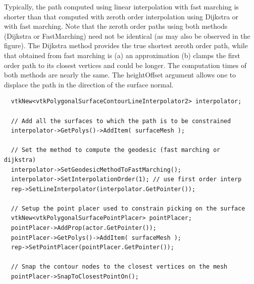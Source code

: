 \documentclass{InsightArticle}
\begin{document}
Typically, the path computed using linear interpolation with fast marching is shorter than that computed with zeroth order interpolation using Dijkstra or with fast marching.
Note that the zeroth order paths using both methods (Dijkstra or FastMarching) need not be identical (as may also be observed in the figure). 
The Dijkstra method provides the true shortest zeroth order path, while that obtained from fast marching is (a) an approximation (b) clamps the first order path to its closest vertices and could be longer.
The computation times of both methods are nearly the same. The heightOffset argument allows one to displace the path in the direction of the surface normal.

\begin{lstlisting}
  vtkNew<vtkPolygonalSurfaceContourLineInterpolator2> interpolator;

  // Add all the surfaces to which the path is to be constrained
  interpolator->GetPolys()->AddItem( surfaceMesh );

  // Set the method to compute the geodesic (fast marching or dijkstra)
  interpolator->SetGeodesicMethodToFastMarching();
  interpolator->SetInterpolationOrder(1); // use first order interp
  rep->SetLineInterpolator(interpolator.GetPointer());

  // Setup the point placer used to constrain picking on the surface
  vtkNew<vtkPolygonalSurfacePointPlacer> pointPlacer;
  pointPlacer->AddProp(actor.GetPointer());
  pointPlacer->GetPolys()->AddItem( surfaceMesh );
  rep->SetPointPlacer(pointPlacer.GetPointer());

  // Snap the contour nodes to the closest vertices on the mesh
  pointPlacer->SnapToClosestPointOn();
\end{lstlisting}




%
\end{document}
